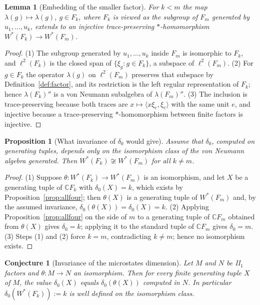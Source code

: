 \documentclass[11pt]{article}
\theoremstyle{plain}
\newtheorem{lemma}[theorem]{Lemma}
\newtheorem{proposition}[theorem]{Proposition}
\newtheorem{conjecture}[theorem]{Conjecture}
\theoremstyle{definition}
\theoremstyle{remark}
\newcommand{\C}{\mathbb{C}}\newcommand{\N}{\mathbb{N}}
\begin{document}
\begin{lemma}[Embedding of the smaller factor]\label{lem:embed}
For $k<m$ the map $\lambda(g)\mapsto\lambda(g)$, $g\in F_k$, where $F_k$ is viewed as the subgroup of $F_m$ generated by $u_1,\dots,u_k$, extends to an injective trace-preserving $*$-homomorphism $W^*(F_k)\to W^*(F_m)$.
\end{lemma}

\begin{proof}
(1) The subgroup generated by $u_1,\dots,u_k$ inside $F_m$ is isomorphic to $F_k$, and $\ell^2(F_k)$ is the closed span of $\{\xi_g: g\in F_k\}$, a subspace of $\ell^2(F_m)$.
(2) For $g\in F_k$ the operator $\lambda(g)$ on $\ell^2(F_m)$ preserves that subspace by Definition~\ref{def:factor}, and its restriction is the left regular representation of $F_k$; hence $\lambda(F_k)''$ is a von Neumann subalgebra of $\lambda(F_m)''$.
(3) The inclusion is trace-preserving because both traces are $x\mapsto\langle x\xi_e,\xi_e\rangle$ with the same unit $e$, and injective because a trace-preserving $*$-homomorphism between finite factors is injective.
\end{proof}

\begin{proposition}[What invariance of $\delta_0$ would give]\label{prop:cond}
Assume that $\delta_0$, computed on generating tuples, depends only on the isomorphism class of the von Neumann algebra generated. Then $W^*(F_k)\not\cong W^*(F_m)$ for all $k\neq m$.
\end{proposition}

\begin{proof}
(1) Suppose $\theta:W^*(F_k)\to W^*(F_m)$ is an isomorphism, and let $X$ be a generating tuple of $\C F_k$ with $\delta_0(X)=k$, which exists by Proposition~\ref{prop:allfour}; then $\theta(X)$ is a generating tuple of $W^*(F_m)$ and, by the assumed invariance, $\delta_0(\theta(X))=\delta_0(X)=k$.
(2) Applying Proposition~\ref{prop:allfour} on the side of $m$ to a generating tuple of $\C F_m$ obtained from $\theta(X)$ gives $\delta_0=k$; applying it to the standard tuple of $\C F_m$ gives $\delta_0=m$.
(3) Steps (1) and (2) force $k=m$, contradicting $k\neq m$; hence no isomorphism exists.
\end{proof}

\begin{conjecture}[Invariance of the microstates dimension]\label{conjInv}
Let $M$ and $N$ be II$_1$ factors and $\theta:M\to N$ an isomorphism. Then for every finite generating tuple $X$ of $M$, the value $\delta_0(X)$ equals $\delta_0(\theta(X))$ computed in $N$. In particular $\delta_0(W^*(F_k)):=k$ is well defined on the isomorphism class.
\end{conjecture}
\end{document}
